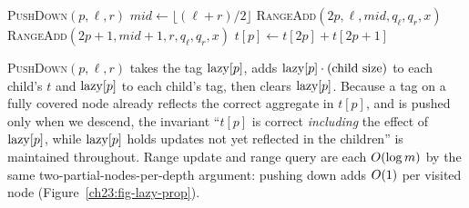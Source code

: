 \begin{algorithm}[H]
\DontPrintSemicolon
\caption{\textsc{RangeAdd}$(p,\ell,r,\, q_\ell,q_r,\, x)$ -- add $x$ to $A[q_\ell\ldots q_r]$}
\textsc{PushDown}$(p,\ell,r)$\;
$\textit{mid} \gets \lfloor(\ell+r)/2\rfloor$\;
\textsc{RangeAdd}$(2p,\ell,\textit{mid},q_\ell,q_r,x)$\;
\textsc{RangeAdd}$(2p{+}1,\textit{mid}{+}1,r,q_\ell,q_r,x)$\;
$t[p] \gets t[2p] + t[2p{+}1]$\;
\end{algorithm}

\textsc{PushDown}$(p,\ell,r)$ takes the tag $\mathrm{lazy}[p]$, adds $\mathrm{lazy}[p]\cdot(\text{child size})$
to each child's $t$ and $\mathrm{lazy}[p]$ to each child's tag, then clears $\mathrm{lazy}[p]$. Because a tag on a
fully covered node already reflects the correct aggregate in $t[p]$, and is pushed only when
we descend, the invariant ``$t[p]$ is correct \emph{including} the effect of $\mathrm{lazy}[p]$, while
$\mathrm{lazy}[p]$ holds updates not yet reflected in the children'' is maintained throughout. Range
update and range query are each $O(\log m)$ by the same two-partial-nodes-per-depth
argument: pushing down adds $O(1)$ per visited node (Figure~\ref{ch23:fig-lazy-prop}).

